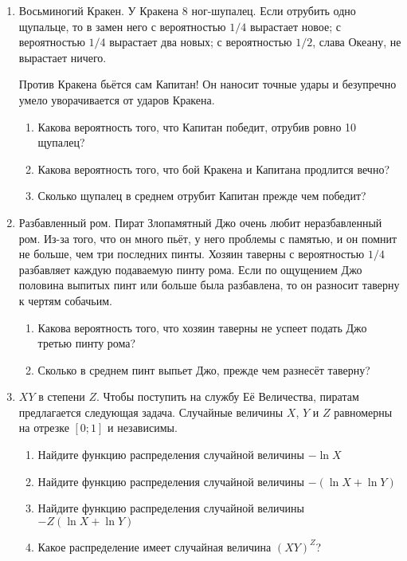 \begin{enumerate}
\item Восьминогий Кракен. У Кракена 8 ног-шупалец. Если отрубить одно щупальце,
то в замен него с вероятностью $1/4$ вырастает новое; с вероятностью $1/4$ вырастает
два новых; с вероятностью $1/2$, слава Океану, не вырастает ничего.

Против Кракена бьётся сам Капитан! Он наносит точные удары и безупречно умело
уворачивается от ударов Кракена.
\begin{enumerate}
\item Какова вероятность того, что Капитан победит, отрубив ровно 10 щупалец?
\item Какова вероятность того, что бой Кракена и Капитана продлится вечно?
\item Сколько щупалец в среднем отрубит Капитан прежде чем победит?
\end{enumerate}

\item Разбавленный ром. Пират Злопамятный Джо очень любит неразбавленный ром. Из-за
того, что он много пьёт, у него проблемы с памятью, и он помнит не
больше, чем три последних пинты. Хозяин таверны с вероятностью $1/4$ разбавляет
каждую подаваемую пинту рома. Если по ощущением Джо половина выпитых
пинт или больше была разбавлена, то он разносит таверну к чертям собачьим.
\begin{enumerate}
\item Какова вероятность того, что хозяин таверны не успеет подать Джо третью пинту рома?
\item Сколько в среднем пинт выпьет Джо, прежде чем разнесёт таверну?
\end{enumerate}

\item $XY$ в степени $Z$. Чтобы поступить на службу Её Величества, пиратам предлагается
следующая задача. Случайные величины $X$, $Y$ и $Z$ равномерны на отрезке $[0;1]$
и независимы.
\begin{enumerate}
\item Найдите функцию распределения случайной величины $-\ln X$
\item Найдите функцию распределения случайной величины $-(\ln X + \ln Y)$
\item Найдите функцию распределения случайной величины $-Z(\ln X + \ln Y)$
\item Какое распределение имеет случайная величина $(XY)^Z$?
\end{enumerate}


\end{enumerate}
